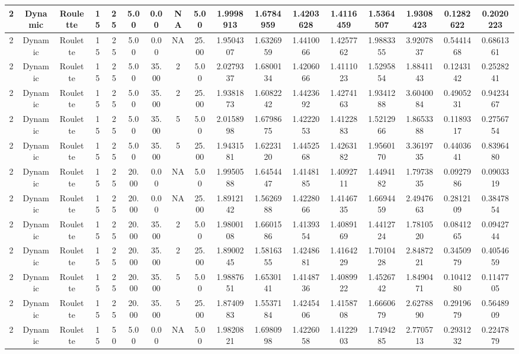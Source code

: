 \begin{longtable}{ | c | c | c | c | c | c | c | c | c | c | c | c | c | c | c | c | c | }
	\hline
	2	&	Dynamic	&	Roulette	&	15	&	25	&	5.00	&	0.00	&	NA	&	5.00	&	1.9998913	&	1.6784959	&	1.4203628	&	1.4116459	&	1.5364507	&	1.9308423	&	0.1282622	&	0.2020223 \\
	\hline
	2	&	Dynamic	&	Roulette	&	15	&	25	&	5.00	&	0.00	&	NA	&	25.00	&	1.9504307	&	1.6326959	&	1.4410066	&	1.4257762	&	1.9883355	&	3.9207837	&	0.5441468	&	0.6861361 \\
	\hline
	2	&	Dynamic	&	Roulette	&	15	&	25	&	5.00	&	35.00	&	2	&	5.00	&	2.0279337	&	1.6800134	&	1.4206066	&	1.4111023	&	1.5295854	&	1.8841143	&	0.1243142	&	0.2528241 \\
	\hline
	2	&	Dynamic	&	Roulette	&	15	&	25	&	5.00	&	35.00	&	2	&	25.00	&	1.9381873	&	1.6082242	&	1.4423692	&	1.4274163	&	1.9341288	&	3.6040084	&	0.4905231	&	0.9423467 \\
	\hline
	2	&	Dynamic	&	Roulette	&	15	&	25	&	5.00	&	35.00	&	5	&	5.00	&	2.0158998	&	1.6798675	&	1.4222053	&	1.4122883	&	1.5212966	&	1.8653388	&	0.1189317	&	0.2756754 \\
	\hline
	2	&	Dynamic	&	Roulette	&	15	&	25	&	5.00	&	35.00	&	5	&	25.00	&	1.9431581	&	1.6223120	&	1.4452568	&	1.4263182	&	1.9560170	&	3.3619735	&	0.4403641	&	0.8396480 \\
	\hline
	2	&	Dynamic	&	Roulette	&	15	&	25	&	20.00	&	0.00	&	NA	&	5.00	&	1.9950588	&	1.6454447	&	1.4148185	&	1.4092711	&	1.4494182	&	1.7973835	&	0.0927986	&	0.0903319 \\
	\hline
	2	&	Dynamic	&	Roulette	&	15	&	25	&	20.00	&	0.00	&	NA	&	25.00	&	1.8912142	&	1.5626988	&	1.4228066	&	1.4146735	&	1.6694459	&	2.4947663	&	0.2812109	&	0.3847854 \\
	\hline
	2	&	Dynamic	&	Roulette	&	15	&	25	&	20.00	&	35.00	&	2	&	5.00	&	1.9800108	&	1.6601586	&	1.4139354	&	1.4089169	&	1.4412724	&	1.7810520	&	0.0841265	&	0.0942744 \\
	\hline
	2	&	Dynamic	&	Roulette	&	15	&	25	&	20.00	&	35.00	&	2	&	25.00	&	1.8900245	&	1.5816355	&	1.4248681	&	1.4164229	&	1.7010428	&	2.8487221	&	0.3450979	&	0.4054659 \\
	\hline
	2	&	Dynamic	&	Roulette	&	15	&	25	&	20.00	&	35.00	&	5	&	5.00	&	1.9887651	&	1.6530141	&	1.4148736	&	1.4089922	&	1.4526742	&	1.8490471	&	0.1041280	&	0.1147705 \\
	\hline
	2	&	Dynamic	&	Roulette	&	15	&	25	&	20.00	&	35.00	&	5	&	25.00	&	1.8740983	&	1.5537184	&	1.4245406	&	1.4158708	&	1.6660679	&	2.6278890	&	0.2919679	&	0.5648909 \\
	\hline
	2	&	Dynamic	&	Roulette	&	15	&	50	&	5.00	&	0.00	&	NA	&	5.00	&	1.9820821	&	1.6980998	&	1.4226058	&	1.4122903	&	1.7494285	&	2.7705713	&	0.2931232	&	0.2247879 \\

\end{longtable}
